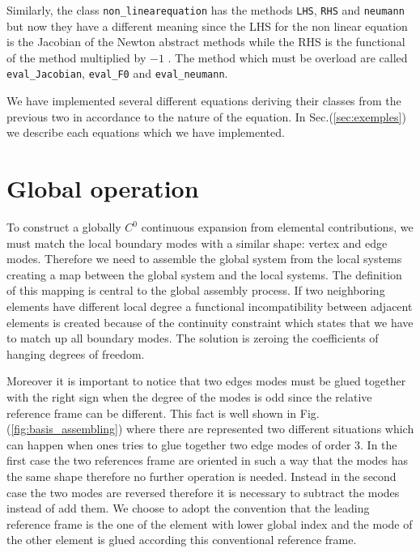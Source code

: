 Similarly, the class \verb|non_linearequation| has the methods \verb|LHS|, \verb|RHS| and \verb|neumann| but now they have a different meaning since the LHS for the non linear equation is the Jacobian of the Newton abstract methods while the RHS is the functional of the method multiplied by $-1$ . The method which must be overload are called \verb|eval_Jacobian|, \verb|eval_F0| and \verb|eval_neumann|.
\medskip

We have implemented several different equations deriving their classes from the previous two in accordance to the nature of the equation. In Sec.(\ref{sec:exemples}) we describe each equations which we have implemented.

\section{Global operation}\label{sec:global_assembling}
To construct a globally $C^0$ continuous expansion from elemental contributions, we must match the local boundary modes with a similar shape: vertex and edge modes. Therefore we need to assemble the global system from the local systems creating a map between the global system and the local systems. The definition of this mapping is central to the global assembly process. If two neighboring elements have different local degree  a functional incompatibility between adjacent elements is created because of the continuity constraint which states that we have to match up all boundary modes. The solution is zeroing the coefficients of hanging degrees of freedom.
\medskip

Moreover it is important to notice that two edges modes must be glued together with the right sign when the degree of the modes is odd since the relative reference frame can be different. This fact is well shown in Fig.(\ref{fig:basis_assembling}) where there are represented two different situations which can happen when ones tries to glue together two edge modes of order 3. In the first case the two references frame are oriented in such a way that the modes has the same shape therefore no further operation is needed. Instead in the second case the two modes are reversed therefore it is necessary to subtract the modes instead of add them. We choose to adopt the convention that the leading reference frame is the one of the element with lower global index and the mode of the other element is glued according this conventional reference frame.

